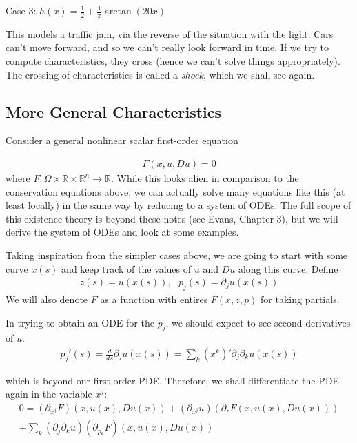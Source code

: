 \documentclass{article}
\newcommand{\R}{{\mathbb{R}}}
\newcommand{\pd}{\partial}
\begin{document}
	\vspace{0.25cm}
	
	Case 3: $h(x) = \frac{1}{2} + \frac{1}{\pi} \arctan(20x)$
	
	This models a traffic jam, via the reverse of the situation with the light. Cars can't move forward, and so we can't really look forward in time. If we try to compute characteristics, they cross (hence we can't solve things appropriately). The crossing of characteristics is called a \textit{shock}, which we shall see again. 
	
	
	\vspace{0.25 cm}
	
	
	\subsection{More General Characteristics}
	
	Consider a general nonlinear scalar first-order equation
	
	\begin{align*}
		F(x,u,Du) = 0
	\end{align*}
	where $F: \Omega \times \R\times \R^{n} \to \R$. While this looks alien in comparison to the conservation equations above, we can actually solve many equations like this (at least locally) in the same way by reducing to a system of ODEs. The full scope of this existence theory is beyond these notes (see Evans, Chapter 3), but we will derive the system of ODEs and look at some examples.
	
	Taking inspiration from the simpler cases above, we are going to start with some curve $x(s)$ and keep track of the values of $u$ and $Du$ along this curve. Define
	\begin{align*}
		z(s) = u(x(s)), \,\,\,\, p_{j}(s) = \pd_{j}u (x(s))
	\end{align*}
	We will also denote $F$ as a function with entires $F(x,z,p)$ for taking partials. 
	
	In trying to obtain an ODE for the $p_j$, we should expect to see second derivatives of $u$:
	\begin{align*}
		p_{j}'(s) = \frac{d}{ds} \pd_{j}u(x(s)) = \sum_{k} (x^k)' \pd_{j}\pd_{k}u(x(s))
	\end{align*}
	
	which is beyond our first-order PDE. Therefore, we shall differentiate the PDE again in the variable $x^j$: 
	\begin{align*}
		0 = (\pd_{x^j}F)(x,u(x),Du(x)) + (\pd_{x^j}u)(\pd_{z}F(x,u(x),Du(x))) \\
		+ \sum_{k}(\pd_{j}\pd_{k} u)(\pd_{p_k}F)(x,u(x),Du(x))
	\end{align*}
	
\end{document}

